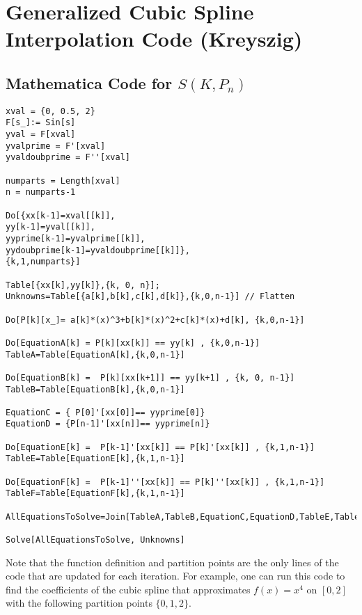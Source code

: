 

%
\chapter*{\thechapter \quad Generalized Cubic Spline Interpolation Code (Kreyszig)}
\label{appendixA}

\section{Mathematica Code for $S(K, P_{n})$}
\begin{lstlisting}
xval = {0, 0.5, 2}         
F[s_]:= Sin[s]        
yval = F[xval]
yvalprime = F'[xval]
yvaldoubprime = F''[xval]      

numparts = Length[xval]
n = numparts-1                 

Do[{xx[k-1]=xval[[k]],               
yy[k-1]=yval[[k]],
yyprime[k-1]=yvalprime[[k]],
yydoubprime[k-1]=yvaldoubprime[[k]]},
{k,1,numparts}]

Table[{xx[k],yy[k]},{k, 0, n}];
Unknowns=Table[{a[k],b[k],c[k],d[k]},{k,0,n-1}] // Flatten           

Do[P[k][x_]= a[k]*(x)^3+b[k]*(x)^2+c[k]*(x)+d[k], {k,0,n-1}]

Do[EquationA[k] = P[k][xx[k]] == yy[k] , {k,0,n-1}]
TableA=Table[EquationA[k],{k,0,n-1}]

Do[EquationB[k] =  P[k][xx[k+1]] == yy[k+1] , {k, 0, n-1}]  
TableB=Table[EquationB[k],{k,0,n-1}]

EquationC = { P[0]'[xx[0]]== yyprime[0]}
EquationD = {P[n-1]'[xx[n]]== yyprime[n]}

Do[EquationE[k] =  P[k-1]'[xx[k]] == P[k]'[xx[k]] , {k,1,n-1}]
TableE=Table[EquationE[k],{k,1,n-1}]

Do[EquationF[k] =  P[k-1]''[xx[k]] == P[k]''[xx[k]] , {k,1,n-1}]
TableF=Table[EquationF[k],{k,1,n-1}]

AllEquationsToSolve=Join[TableA,TableB,EquationC,EquationD,TableE,TableF]

Solve[AllEquationsToSolve, Unknowns] 
\end{lstlisting}

Note that the function definition and partition points are the only lines of the code that are updated for each iteration. For example, one can run this code to find the coefficients of the cubic spline that approximates $f(x)=x^4$ on $[0,2]$ with the following partition points $\{0,1,2\}$.